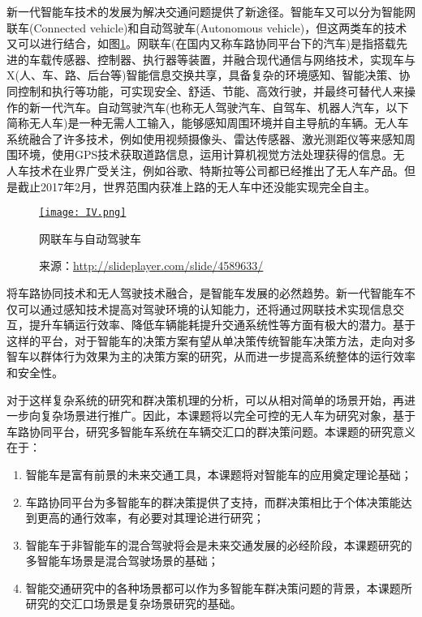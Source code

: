   新一代智能车技术的发展为解决交通问题提供了新途径。智能车又可以分为智能网联车(Connected vehicle)和自动驾驶车(Autonomous vehicle)，但这两类车的技术又可以进行结合，如图\ref{fig:IV}。网联车(在国内又称车路协同平台下的汽车)是指搭载先进的车载传感器、控制器、执行器等装置，并融合现代通信与网络技术，实现车与X(人、车、路、后台等)智能信息交换共享，具备复杂的环境感知、智能决策、协同控制和执行等功能，可实现安全、舒适、节能、高效行驶，并最终可替代人来操作的新一代汽车\cite{谢志萍2016智能网联汽车环境感知技术的发展和研究现状}。自动驾驶汽车(也称无人驾驶汽车、自驾车、机器人汽车\cite{Thrun2010Toward}，以下简称无人车)是一种无需人工输入，能够感知周围环境并自主导航的车辆。无人车系统融合了许多技术，例如使用视频摄像头、雷达传感器、激光测距仪等来感知周围环境，使用GPS技术获取道路信息，运用计算机视觉方法处理获得的信息。无人车技术在业界广受关注，例如谷歌\cite{google2017self}、特斯拉\cite{tesla2017model}等公司都已经推出了无人车产品。但是截止2017年2月，世界范围内获准上路的无人车中还没能实现完全自主。

  \begin{figure}
  \centering
  \href{http://slideplayer.com/slide/4589633/}{\texttt{[image: IV.png]}}
  \caption{网联车与自动驾驶车}
  \label{fig:IV}
  \caption*{来源：\url{http://slideplayer.com/slide/4589633/}}
  \end{figure}

  将车路协同技术和无人驾驶技术融合，是智能车发展的必然趋势。新一代智能车不仅可以通过感知技术提高对驾驶环境的认知能力，还将通过网联技术实现信息交互，提升车辆运行效率、降低车辆能耗提升交通系统性等方面有极大的潜力。基于这样的平台，对于智能车的决策方案有望从单决策传统智能车决策方法，走向对多智车以群体行为效果为主的决策方案的研究，从而进一步提高系统整体的运行效率和安全性。

  对于这样复杂系统的研究和群决策机理的分析，可以从相对简单的场景开始，再进一步向复杂场景进行推广。因此，本课题将以完全可控的无人车为研究对象，基于车路协同平台，研究多智能车系统在车辆交汇口的群决策问题。本课题的研究意义在于：

  \begin{enumerate}[label=(\arabic*)]
  \item 智能车是富有前景的未来交通工具，本课题将对智能车的应用奠定理论基础；
  \item 车路协同平台为多智能车的群决策提供了支持，而群决策相比于个体决策能达到更高的通行效率，有必要对其理论进行研究；
  \item 智能车于非智能车的混合驾驶将会是未来交通发展的必经阶段，本课题研究的多智能车场景是混合驾驶场景的基础；
  \item 智能交通研究中的各种场景都可以作为多智能车群决策问题的背景，本课题所研究的交汇口场景是复杂场景研究的基础。
  \end{enumerate}

